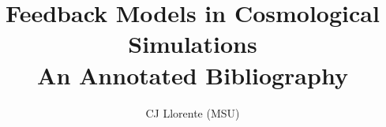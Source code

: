 \documentclass [11pt]{article}
\title{Feedback Models in Cosmological Simulations\\\medskip An Annotated Bibliography}
\author{CJ Llorente (MSU)}
\begin{document}
\maketitle
\nocite{*}


\end{document}
